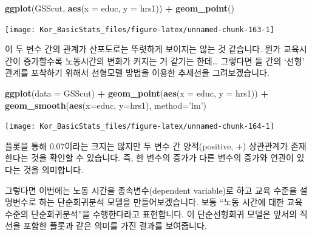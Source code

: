 \documentclass[]{book}
\newenvironment{Shaded}{\begin{snugshade}}{\end{snugshade}}
\newcommand{\DataTypeTok}[1]{\textcolor[rgb]{0.13,0.29,0.53}{#1}}
\newcommand{\KeywordTok}[1]{\textcolor[rgb]{0.13,0.29,0.53}{\textbf{#1}}}
\newcommand{\NormalTok}[1]{#1}
\newcommand{\OperatorTok}[1]{\textcolor[rgb]{0.81,0.36,0.00}{\textbf{#1}}}
\newcommand{\StringTok}[1]{\textcolor[rgb]{0.31,0.60,0.02}{#1}}
\begin{document}
\begin{Shaded}
\begin{Highlighting}[]
\KeywordTok{ggplot}\NormalTok{(GSScut, }\KeywordTok{aes}\NormalTok{(}\DataTypeTok{x =}\NormalTok{ educ, }\DataTypeTok{y =}\NormalTok{ hrs1)) }\OperatorTok{+}\StringTok{ }\KeywordTok{geom_point}\NormalTok{()}
\end{Highlighting}
\end{Shaded}

\begin{center}\texttt{[image: Kor\_BasicStats\_files/figure-latex/unnamed-chunk-163-1]} \end{center}

이 두 변수 간의 관계가 산포도로는 뚜렷하게 보이지는 않는 것 같습니다. 뭔가 교육시간이 증가할수록 노동시간의 변화가 커지는 거 같기는 한데\ldots{} 그렇다면 둘 간의 `선형' 관계를 포착하기 위해서 선형모델 방법을 이용한 추세선을 그려보겠습니다.

\begin{Shaded}
\begin{Highlighting}[]
\KeywordTok{ggplot}\NormalTok{(}\DataTypeTok{data =}\NormalTok{ GSScut) }\OperatorTok{+}\StringTok{ }
\StringTok{  }\KeywordTok{geom_point}\NormalTok{(}\KeywordTok{aes}\NormalTok{(}\DataTypeTok{x =}\NormalTok{ educ, }\DataTypeTok{y =}\NormalTok{ hrs1)) }\OperatorTok{+}
\StringTok{  }\KeywordTok{geom_smooth}\NormalTok{(}\KeywordTok{aes}\NormalTok{(}\DataTypeTok{x=}\NormalTok{educ, }\DataTypeTok{y=}\NormalTok{hrs1), }\DataTypeTok{method=}\StringTok{'lm'}\NormalTok{)}
\end{Highlighting}
\end{Shaded}

\begin{center}\texttt{[image: Kor\_BasicStats\_files/figure-latex/unnamed-chunk-164-1]} \end{center}

플롯을 통해 0.07이라는 크지는 않지만 두 변수 간 양적(positive, +) 상관관계가 존재한다는 것을 확인할 수 있습니다. 즉, 한 변수의 증가가 다른 변수의 증가와 연관이 있다는 것을 의미합니다.

그렇다면 이번에는 노동 시간을 종속변수(dependent variable)로 하고 교육 수준을 설명변수로 하는 단순회귀분석 모델을 만들어보겠습니다. 보통 ``노동 시간에 대한 교육 수준의 단순회귀분석''을 수행한다라고 표현합니다. 이 단순선형회귀 모델은 앞서의 직선을 포함한 플롯과 같은 의미를 가진 결과를 보여줍니다.

\begin{Shaded}
\end{Shaded}
\end{document}

